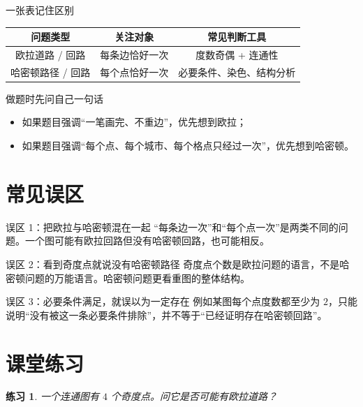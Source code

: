 \documentclass[11pt,a4paper,fontset=fandol]{ctexart}
\theoremstyle{formaltheorem}
\theoremstyle{formalexample}
\newtheorem{exercise}{练习}[section]
\begin{document}
\begin{goalbox}{一张表记住区别}
\begin{center}
\renewcommand{\arraystretch}{1.35}
\begin{tabular}{|c|c|c|}
\hline
问题类型 & 关注对象 & 常见判断工具 \\
\hline
欧拉道路 / 回路 & 每条边恰好一次 & 度数奇偶 + 连通性 \\
\hline
哈密顿路径 / 回路 & 每个点恰好一次 & 必要条件、染色、结构分析 \\
\hline
\end{tabular}
\end{center}
\end{goalbox}

\begin{skillbox}{做题时先问自己一句话}
\begin{itemize}
  \item 如果题目强调“一笔画完、不重边”，优先想到欧拉；
  \item 如果题目强调“每个点、每个城市、每个格点只经过一次”，优先想到哈密顿。
\end{itemize}
\end{skillbox}

\section{常见误区}

\begin{notebox}{误区 1：把欧拉与哈密顿混在一起}
“每条边一次”和“每个点一次”是两类不同的问题。一个图可能有欧拉回路但没有哈密顿回路，也可能相反。
\end{notebox}

\begin{notebox}{误区 2：看到奇度点就说没有哈密顿路径}
奇度点个数是欧拉问题的语言，不是哈密顿问题的万能语言。哈密顿问题更看重图的整体结构。
\end{notebox}

\begin{notebox}{误区 3：必要条件满足，就误以为一定存在}
例如某图每个点度数都至少为 $2$，只能说明“没有被这一条必要条件排除”，并不等于“已经证明存在哈密顿回路”。
\end{notebox}

\section{课堂练习}

\begin{exercise}
一个连通图有 $4$ 个奇度点。问它是否可能有欧拉道路？
\end{exercise}
\end{document}
